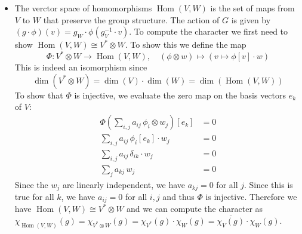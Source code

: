 \documentclass[a4paper,11pt,oneside]{article}
\begin{document}
{\begin{itemize}
            \item The verctor space of homomorphisms \(\operatorname{Hom}(V,W)\) is the set of maps from \(V\) to \(W\) that preserve the group structure. The action of \(G\) is given by \((g \cdot \phi)(v) = g_W\cdot\phi(g^{-1}_V \cdot v)\). To compute the character we first need to show \(\operatorname{Hom}(V,W) \cong V^* \otimes W \). To show this we define the map
                \[\Phi : V^* \otimes W \to \operatorname{Hom}(V,W), \quad (\phi \otimes w) \mapsto (v \mapsto \phi[v] \cdot w)\]
            This is indeed an isomorphism since \[\operatorname{dim}(V^* \otimes W) = \operatorname{dim}(V) \cdot \operatorname{dim}(W) = \operatorname{dim}(\operatorname{Hom}(V,W))\]
            To show that \(\Phi\) is injective, we evaluate the zero map on the basis vectors \(e_k\) of \(V\):
            \begin{align*}
                \Phi \left( \sum_{i,j} a_{ij} \, \phi_i \otimes w_j \right)[e_k] &= 0 \\
                \sum_{i,j} a_{ij} \, \phi_i[e_k] \cdot w_j &= 0 \\
                \sum_{i,j} a_{ij} \, \delta_{ik} \cdot w_j &= 0 \\
                \sum_j a_{kj} \, w_j &= 0
            \end{align*}
            Since the \(w_j\) are linearly independent, we have \(a_{kj} = 0\) for all \(j\). Since this is true for all \(k\), we have \(a_{ij} = 0\) for all \(i,j\) and thus \(\Phi\) is injective. Therefore we have \(\operatorname{Hom}(V,W) \cong V^* \otimes W\) and we can compute the character as \(\chi_{\operatorname{Hom}(V,W)}(g) = \chi_{V^* \otimes W}(g) = \chi_{V^*}(g) \cdot \chi_W(g) = \overline{\chi_V(g)} \cdot \chi_W(g)\).


\end{itemize}}
\end{document}
